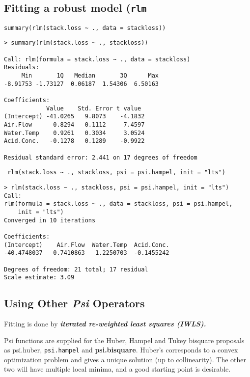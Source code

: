 \documentclass[main.tex]{subfiles}
\begin{document}
\subsection{Fitting a robust model (\texttt{rlm}}
\begin{framed}
\begin{verbatim}
summary(rlm(stack.loss ~ ., data = stackloss))
\end{verbatim}
\end{framed}
\begin{verbatim}
> summary(rlm(stack.loss ~ ., stackloss))

Call: rlm(formula = stack.loss ~ ., data = stackloss)
Residuals:
     Min       1Q   Median       3Q      Max 
-8.91753 -1.73127  0.06187  1.54306  6.50163 

Coefficients:
            Value    Std. Error t value 
(Intercept) -41.0265   9.8073    -4.1832
Air.Flow      0.8294   0.1112     7.4597
Water.Temp    0.9261   0.3034     3.0524
Acid.Conc.   -0.1278   0.1289    -0.9922

Residual standard error: 2.441 on 17 degrees of freedom
\end{verbatim}
\begin{framed}
\begin{verbatim}
 rlm(stack.loss ~ ., stackloss, psi = psi.hampel, init = "lts")
\end{verbatim}
\end{framed}
\begin{verbatim}
> rlm(stack.loss ~ ., stackloss, psi = psi.hampel, init = "lts")
Call:
rlm(formula = stack.loss ~ ., data = stackloss, psi = psi.hampel, 
    init = "lts")
Converged in 10 iterations

Coefficients:
(Intercept)    Air.Flow  Water.Temp  Acid.Conc. 
-40.4748037   0.7410863   1.2250703  -0.1455242 

Degrees of freedom: 21 total; 17 residual
Scale estimate: 3.09 
\end{verbatim}
\subsection{Using Other \textit{Psi} Operators}

Fitting is done by \textbf{\emph{iterated re-weighted least squares (IWLS).}}

Psi functions are supplied for the Huber, Hampel and Tukey bisquare proposals as psi.huber, \texttt{psi.hampel} and \textbf{psi.bisquare}. Huber's corresponds to a convex optimization problem and gives a unique solution (up to collinearity). The other two will have multiple local minima, and a good starting point is desirable.
\end{document}
